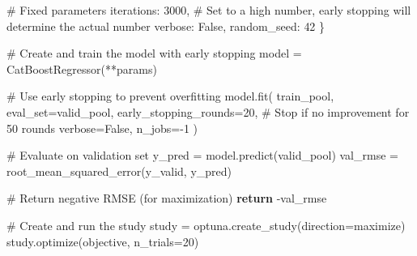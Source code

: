 \documentclass[
  letterpaper,
  DIV=11,
  numbers=noendperiod]{scrreprt}
\newenvironment{Shaded}{\begin{snugshade}}{\end{snugshade}}
\newcommand{\CommentTok}[1]{\textcolor[rgb]{0.37,0.37,0.37}{#1}}
\newcommand{\ControlFlowTok}[1]{\textcolor[rgb]{0.00,0.23,0.31}{\textbf{#1}}}
\newcommand{\DecValTok}[1]{\textcolor[rgb]{0.68,0.00,0.00}{#1}}
\newcommand{\NormalTok}[1]{\textcolor[rgb]{0.00,0.23,0.31}{#1}}
\newcommand{\OperatorTok}[1]{\textcolor[rgb]{0.37,0.37,0.37}{#1}}
\newcommand{\StringTok}[1]{\textcolor[rgb]{0.13,0.47,0.30}{#1}}
\newcommand{\VariableTok}[1]{\textcolor[rgb]{0.07,0.07,0.07}{#1}}
\begin{document}
\begin{Shaded}
\begin{Highlighting}[]
        \CommentTok{\# Fixed parameters}
        \StringTok{\textquotesingle{}iterations\textquotesingle{}}\NormalTok{: }\DecValTok{3000}\NormalTok{,  }\CommentTok{\# Set to a high number, early stopping will determine the actual number}
        \StringTok{\textquotesingle{}verbose\textquotesingle{}}\NormalTok{: }\VariableTok{False}\NormalTok{,}
        \StringTok{\textquotesingle{}random\_seed\textquotesingle{}}\NormalTok{: }\DecValTok{42}
\NormalTok{    \}}
    
    \CommentTok{\# Create and train the model with early stopping}
\NormalTok{    model }\OperatorTok{=}\NormalTok{ CatBoostRegressor(}\OperatorTok{**}\NormalTok{params)}
    
    \CommentTok{\# Use early stopping to prevent overfitting}
\NormalTok{    model.fit(}
\NormalTok{        train\_pool,}
\NormalTok{        eval\_set}\OperatorTok{=}\NormalTok{valid\_pool,}
\NormalTok{        early\_stopping\_rounds}\OperatorTok{=}\DecValTok{20}\NormalTok{,  }\CommentTok{\# Stop if no improvement for 50 rounds}
\NormalTok{        verbose}\OperatorTok{=}\VariableTok{False}\NormalTok{,}
\NormalTok{        n\_jobs}\OperatorTok{={-}}\DecValTok{1}
\NormalTok{    )}
    
    \CommentTok{\# Evaluate on validation set}
\NormalTok{    y\_pred }\OperatorTok{=}\NormalTok{ model.predict(valid\_pool)}
\NormalTok{    val\_rmse }\OperatorTok{=}\NormalTok{ root\_mean\_squared\_error(y\_valid, y\_pred)}
    
    \CommentTok{\# Return negative RMSE (for maximization)}
    \ControlFlowTok{return} \OperatorTok{{-}}\NormalTok{val\_rmse}

\CommentTok{\# Create and run the study}
\NormalTok{study }\OperatorTok{=}\NormalTok{ optuna.create\_study(direction}\OperatorTok{=}\StringTok{\textquotesingle{}maximize\textquotesingle{}}\NormalTok{)}
\NormalTok{study.optimize(objective, n\_trials}\OperatorTok{=}\DecValTok{20}\NormalTok{)}
\end{Highlighting}
\end{Shaded}
\end{document}
